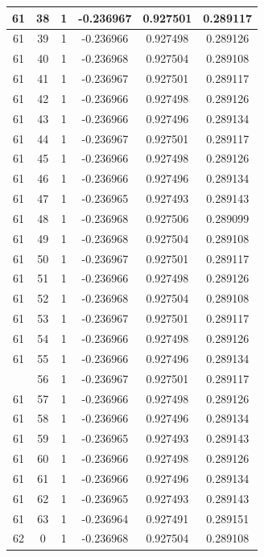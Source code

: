 \documentclass[12pt,a4paper]{article}
\numberwithin{equation}{section}
\numberwithin{figure}{section}
\numberwithin{table}{section}
\begin{document}
\begin{longtable}{|c|c|c|c|c|c|}
61 & 38 & 1 & -0.236967 & 0.927501 & 0.289117 \\ \hline
61 & 39 & 1 & -0.236966 & 0.927498 & 0.289126 \\ \hline
61 & 40 & 1 & -0.236968 & 0.927504 & 0.289108 \\ \hline
61 & 41 & 1 & -0.236967 & 0.927501 & 0.289117 \\ \hline
61 & 42 & 1 & -0.236966 & 0.927498 & 0.289126 \\ \hline
61 & 43 & 1 & -0.236966 & 0.927496 & 0.289134 \\ \hline
61 & 44 & 1 & -0.236967 & 0.927501 & 0.289117 \\ \hline
61 & 45 & 1 & -0.236966 & 0.927498 & 0.289126 \\ \hline
61 & 46 & 1 & -0.236966 & 0.927496 & 0.289134 \\ \hline
61 & 47 & 1 & -0.236965 & 0.927493 & 0.289143 \\ \hline
61 & 48 & 1 & -0.236968 & 0.927506 & 0.289099 \\ \hline
61 & 49 & 1 & -0.236968 & 0.927504 & 0.289108 \\ \hline
61 & 50 & 1 & -0.236967 & 0.927501 & 0.289117 \\ \hline
61 & 51 & 1 & -0.236966 & 0.927498 & 0.289126 \\ \hline
61 & 52 & 1 & -0.236968 & 0.927504 & 0.289108 \\ \hline
61 & 53 & 1 & -0.236967 & 0.927501 & 0.289117 \\ \hline
61 & 54 & 1 & -0.236966 & 0.927498 & 0.289126 \\ \hline
61 & 55 & 1 & -0.236966 & 0.927496 & 0.289134 \\ \hline
\pagebreak
61 & 56 & 1 & -0.236967 & 0.927501 & 0.289117 \\ \hline
61 & 57 & 1 & -0.236966 & 0.927498 & 0.289126 \\ \hline
61 & 58 & 1 & -0.236966 & 0.927496 & 0.289134 \\ \hline
61 & 59 & 1 & -0.236965 & 0.927493 & 0.289143 \\ \hline
61 & 60 & 1 & -0.236966 & 0.927498 & 0.289126 \\ \hline
61 & 61 & 1 & -0.236966 & 0.927496 & 0.289134 \\ \hline
61 & 62 & 1 & -0.236965 & 0.927493 & 0.289143 \\ \hline
61 & 63 & 1 & -0.236964 & 0.927491 & 0.289151 \\ \hline
62 & 0 & 1 & -0.236968 & 0.927504 & 0.289108 \\ \hline

\end{longtable}
\end{document}
